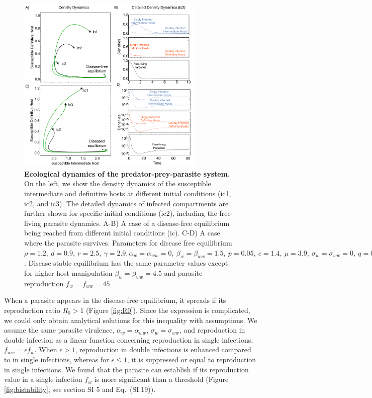 \documentclass[a4paper]{scrartcl}
\begin{document}
\begin{figure}[!ht]
\captionsetup{format=plain}
\includegraphics[width=0.8\textwidth]{Figures/ecotraject_nonlinear.pdf}
\caption{\textbf{Ecological dynamics of the predator-prey-parasite system.} 
On the left, we show the density dynamics of the susceptible intermediate and definitive hosts at different initial conditions (ic1, ic2, and ic3). 
The detailed dynamics of infected compartments are further shown for specific initial conditions (ic2), including the free-living parasite dynamics.
A-B) A case of a disease-free equilibrium being reached from different initial conditions (ic). C-D) A case where the parasite survives.
Parameters for disease free equilibrium $\rho =  1.2, \ d = 0.9, \  r = 2.5, \ \gamma =  2.9, \alpha_w = \alpha_{ww} =  0, \ \beta_w = \beta_{ww} = 1.5, \ p = 0.05, \  c = 1.4, \ \mu = 3.9, \ \sigma_w = \sigma_{ww} = 0, \ q = 0.05, \ f_w = f_{ww} = 7.5, \ \delta = 0.9, \ k = 0.26, \ h = 0.6$. 
Disease stable equilibrium has the same parameter values except for higher host manipulation $ \beta_w =  \beta_{ww} = 4.5$ and parasite reproduction $ f_w  = f_{ww} = 45$}
\label{fig:ecotraject:nonlinear}
\end{figure}

When a parasite appears in the disease-free equilibrium, it spreads if its reproduction ratio $R_0 > 1$ (Figure \ref{fig:R0}). 
Since the expression is complicated, we could only obtain analytical solutions for this inequality with assumptions. 
We assume the same parasite virulence, $\alpha_w = \alpha_{ww}$, $\sigma_w = \sigma_{ww}$, and reproduction in double infection as a linear function concerning reproduction in single infections, $f_{ww} = \epsilon f_w$. 
When $\epsilon > 1$, reproduction in double infections is enhanced compared to in single infections, whereas for $\epsilon \leq 1$, it is suppressed or equal to reproduction in single infections.
We found that the parasite can establish if its reproduction value in a single infection $f_w$ is more significant than a threshold (Figure \ref{fig:bistability}, see section SI 5 and Eq.~(SI.19)). 
\end{document}
